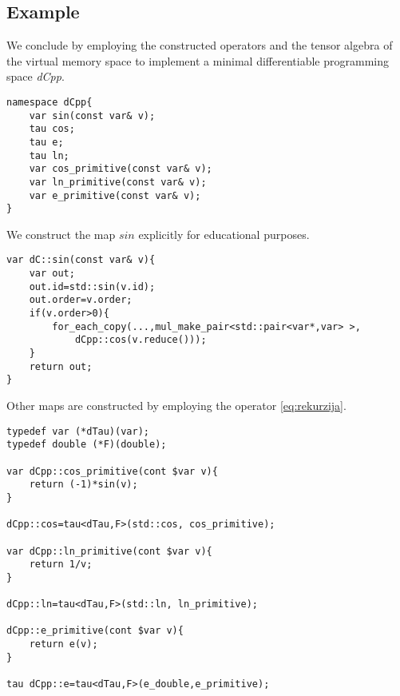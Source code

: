 \subsection{Example}

We conclude by employing the constructed operators and the tensor algebra of the virtual memory space to implement a minimal differentiable programming space \emph{dCpp}.

\begin{lstlisting}
namespace dCpp{
    var sin(const var& v);
    tau cos;
    tau e;
    tau ln;
    var cos_primitive(const var& v);
    var ln_primitive(const var& v);
    var e_primitive(const var& v);
}
\end{lstlisting}

We construct the map $sin$ explicitly for educational purposes.

\begin{lstlisting}
var dC::sin(const var& v){
    var out;
    out.id=std::sin(v.id);
    out.order=v.order;
    if(v.order>0){
    	for_each_copy(...,mul_make_pair<std::pair<var*,var> >,
    		dCpp::cos(v.reduce()));
    }
    return out;
}
\end{lstlisting}
Other maps are constructed by employing the operator \eqref{eq:rekurzija}.
\begin{lstlisting}
typedef var (*dTau)(var);
typedef double (*F)(double);

var dCpp::cos_primitive(cont $var v){
    return (-1)*sin(v);
}

dCpp::cos=tau<dTau,F>(std::cos, cos_primitive);

var dCpp::ln_primitive(cont $var v){
    return 1/v;
}

dCpp::ln=tau<dTau,F>(std::ln, ln_primitive);

dCpp::e_primitive(cont $var v){
    return e(v);
}

tau dCpp::e=tau<dTau,F>(e_double,e_primitive);

\end{lstlisting}

